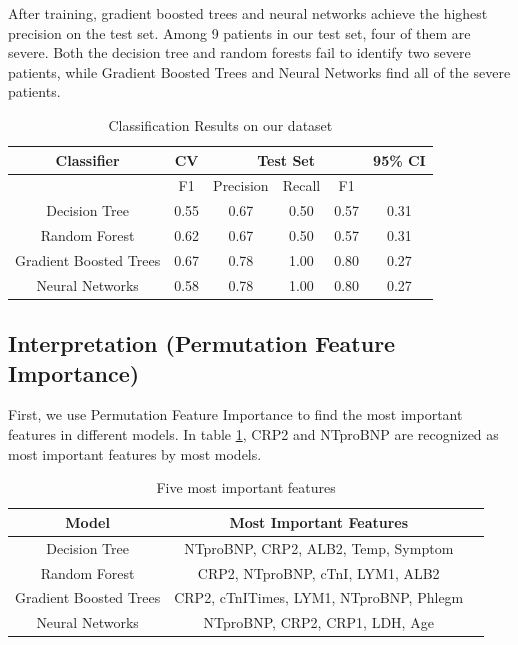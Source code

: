 After training, gradient boosted trees and neural networks achieve the highest precision on the test set. Among 9 patients in our test set, four of them are severe. Both the decision tree and random forests fail to identify two severe patients, while Gradient Boosted Trees and Neural Networks find all of the severe patients. 


\begin{table}[H]
\centering
\begin{tabular}{cccccc}
\toprule
Classifier    & CV & \multicolumn{3}{c}{Test Set} & 95\% CI \\ \midrule
                        & F1     & Precision  & Recall  & F1    &\\
Decision Tree           & 0.55   & 0.67       & 0.50    & 0.57  & 0.31\\
Random Forest           & 0.62   & 0.67       & 0.50    & 0.57  & 0.31\\
Gradient Boosted Trees  & 0.67   & 0.78       & 1.00    & 0.80  & 0.27\\
Neural Networks         & 0.58   & 0.78       & 1.00    & 0.80  & 0.27\\ \bottomrule
\end{tabular}
\caption{Classification Results on our dataset}
\end{table}


\subsection{Interpretation (Permutation Feature Importance)}

First, we use  Permutation Feature Importance to find the most important features in different models. In table \ref{tab:important_feature}, CRP2 and NTproBNP are recognized as most important features by most models.

\begin{table}[H]
\centering
\begin{tabular}{@{}ccc@{}}
\toprule
Model                   & Most Important Features \\ \midrule
Decision Tree           & NTproBNP, CRP2, ALB2, Temp, Symptom      \\
Random Forest           & CRP2, NTproBNP, cTnI, LYM1, ALB2         \\
Gradient Boosted Trees  & CRP2, cTnITimes, LYM1, NTproBNP, Phlegm  \\
Neural Networks         & NTproBNP, CRP2, CRP1, LDH, Age           \\  \bottomrule
\end{tabular}
\caption{Five most important features}
\label{tab:important_feature}
\end{table}

